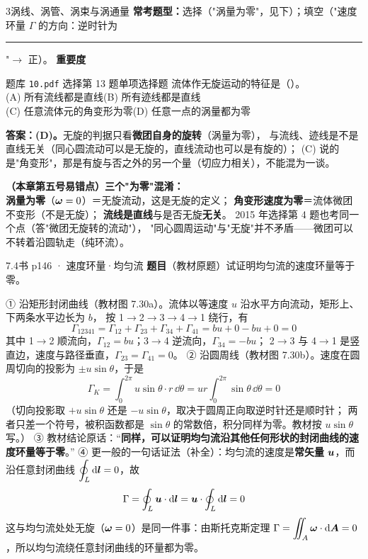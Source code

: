 \begin{kaodian}{3}{涡线、涡管、涡束与涡通量}
\textbf{常考题型：}选择（"涡量为零"，见下）；填空（"速度环量 $\Gamma$ 的方向：逆时针为\rule{1.2cm}{0.4pt}"$\to$ 正）。
\textbf{重要度 }\quad{}\quad{}

\begin{zhenti}{题库 \texttt{10.pdf} 选择第 13 题}{单项选择题}
流体作无旋运动的特征是（\quad）。\\
(A) 所有流线都是直线\quad (B) 所有迹线都是直线\\
(C) 任意流体元的角变形为零\quad (D) 任意一点的涡量都为零
\end{zhenti}
\noindent\textbf{答案：(D)。}无旋的判据只看\textbf{微团自身的旋转}（涡量为零），
与流线、迹线是不是直线无关（同心圆流动可以是无旋的，直线流动也可以是有旋的）；
(C) 说的是"角变形"，那是有旋与否之外的另一个量（切应力相关），不能混为一谈。

\begin{yicuo}
\textbf{（本章第五号易错点）三个"为零"混淆：}\\
\textbf{涡量为零}（$\bm{\omega}=0$）＝无旋流动，这是无旋的定义；
\textbf{角变形速度为零}＝流体微团不变形（不是无旋）；
\textbf{流线是直线}与是否无旋\textbf{无关}。
2015 年选择第 4 题也考同一个点（答"微团无旋转的流动"），
"同心圆周运动"与"无旋"并不矛盾——微团可以不转着沿圆轨走（纯环流）。
\end{yicuo}
\end{kaodian}

\begin{liti}{7.4}{书 p146 · 速度环量·均匀流}
\textbf{题目}（教材原题）试证明均匀流的速度环量等于零。
\begin{jie}[证明]
① 沿矩形封闭曲线（教材图 7.30a）。流体以等速度 $u$ 沿水平方向流动，矩形上、下两条水平边长为 $b$，
按 1$\to$2$\to$3$\to$4$\to$1 绕行，有
\[ \Gamma_{12341}=\Gamma_{12}+\Gamma_{23}+\Gamma_{34}+\Gamma_{41}=bu+0-bu+0=0 \]
其中 1$\to$2 顺流向，$\Gamma_{12}=bu$；3$\to$4 逆流向，$\Gamma_{34}=-bu$；
2$\to$3 与 4$\to$1 是竖直边，速度与路径垂直，$\Gamma_{23}=\Gamma_{41}=0$。
② 沿圆周线（教材图 7.30b）。速度在圆周切向的投影为 $\pm u\sin\theta$，于是
\[ \Gamma_K=\int_0^{2\pi}u\sin\theta\cdot r\,\dd\theta
   =ur\int_0^{2\pi}\sin\theta\,\dd\theta=0 \]
（切向投影取 $+u\sin\theta$ 还是 $-u\sin\theta$，取决于圆周正向取逆时针还是顺时针；
两者只差一个符号，被积函数都是 $\sin\theta$ 的常数倍，积分同样为零。教材按 $u\sin\theta$ 写。）
③ 教材结论原话：“\textbf{同样，可以证明均匀流沿其他任何形状的封闭曲线的速度环量等于零}。”
④ 更一般的一句话证法（补全）：均匀流的速度是\textbf{常矢量} $\bm{u}$，而沿任意封闭曲线 $\displaystyle\oint_L\mathrm{d}\bm{l}=0$，故
\[ \Gamma=\oint_L\bm{u}\cdot\mathrm{d}\bm{l}=\bm{u}\cdot\oint_L\mathrm{d}\bm{l}=0 \]
这与均匀流处处无旋（$\bm{\omega}=0$）是同一件事：由斯托克斯定理
$\Gamma=\displaystyle\iint_A\bm{\omega}\cdot\mathrm{d}\bm{A}=0$，所以均匀流绕任意封闭曲线的环量都为零。
\end{jie}
\end{liti}

